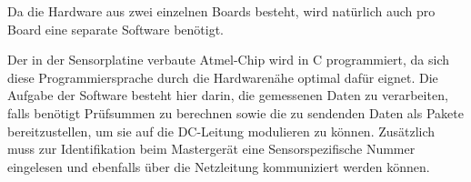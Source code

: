 %

Da die Hardware  aus zwei einzelnen Boards besteht, wird  nat\"urlich auch pro
Board eine separate Software ben\"otigt.

Der  in der  Sensorplatine  verbaute  Atmel-Chip wird  in  C programmiert,  da
sich  diese  Programmiersprache  durch   die  Hardwaren\"ahe  optimal  daf\"ur
eignet. Die Aufgabe der  Software besteht hier darin, die  gemessenen Daten zu
verarbeiten, falls ben\"otigt Pr\"ufsummen zu berechnen sowie die zu sendenden
Daten  als  Pakete  bereitzustellen, um  sie  auf  die  DC-Leitung  modulieren
zu  k\"onnen. Zus\"atzlich muss  zur  Identifikation  beim Masterger\"at  eine
Sensorspezifische  Nummer  eingelesen  und ebenfalls  \"uber  die  Netzleitung
kommuniziert werden k\"onnen.

